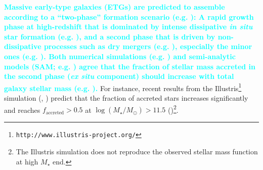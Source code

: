 \documentclass[a4paper,fleqn,usenatbib]{mnras}
\def\mstar{{$M_{\star}$}}
\def\logms{{$\log (M_{\star}/M_{\odot})$}}
\newcommand{\song}[1]{\textcolor{cyan}{\textbf{#1}}}
\begin{document}
    \song{
    Massive early-type galaxies (ETGs) are predicted to assemble according to a 
    ``two-phase'' formation scenario 
    (e.g. \citealt{Oser2010, Oser2012}): A rapid growth phase at high-redshift that 
    is dominated by intense dissipative \textit{in situ} star formation (e.g.
    \citealt{Hopkins2008, Dekel2009}), and a second phase that 
    is driven by non-dissipative processes such as dry mergers 
    (e.g. \citealt{Naab2006, Khochfar2006}), especially the minor ones 
    (e.g. \citealt{Hilz2012, Hilz2013, Oogi2013, Bedorf2013, Laporte2013}).
    Both numerical simulations (e.g. \citealt{Oser2010}) and semi-analytic models 
    (SAM; e.g. \citealt{LeeYi2013, LeeYi2017}) agree that the fraction of stellar 
    mass accreted in the second phase (\textit{ex situ} component) should increase 
    with total galaxy stellar mass (e.g. \citealt{Lackner2012, Cooper2013, Qu2017}).
    }
    For instance, recent results from the 
    Illustris\footnote{\texttt{http://www.illustris-project.org/}} simulation 
    (\citealt{Vogelsberger2014}, \citealt{Genel2014}) predict that the fraction of  
    accreted stars increases significantly and reaches $f_{\mathrm{accreted}}>0.5$ at 
    \logms{}$>11.5$ (\citealt{RodriguezGomez2016})\footnote{The Illustris simulation
    does not reproduce the observed stellar mass function at high \mstar{} end.}. 
    
\end{document}
